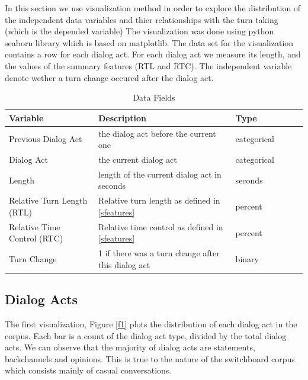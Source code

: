 In this section we use visualization method in order to explore the distribution of the independent data variables and thier relationships with the turn taking (which is the depended variable) 
%
The visualization was done using python seaborn library which is based on matplotlib. The data set for the visualization contains a row for each dialog act. For each dialog act we measure its length, and the values of the summary features (RTL and RTC). The independent variable denote wether a turn change occured after the dialog act.

\begin{table}[ht!]
\begin{center}
\begin{tabular}{llllrr}
\toprule
Variable &  Description & Type &\\
\midrule
     Previous Dialog Act & the dialog act before the current one  & categorical\\
     Dialog Act & the current dialog act & categorical \\
     Length & length of the current dialog act in seconds & seconds \\
     Relative Turn Length (RTL)  & Relative turn length as defined in \ref{sfeatures} & percent \\
     Relative Time Control (RTC) & Relative time control as defined in \ref{sfeatures} & percent \\
     Turn Change & 1 if there was a turn change after this dialog act & binary \\
\bottomrule
\end{tabular}
\end{center}
\caption{Data Fields}
\end{table}


\subsection{Dialog Acts}

The first visualization, Figure \ref{f1} plots the distribution of each dialog act in the corpus. Each bar is a count of the dialog act type, divided by the total dialog acts.  We can observe that the majority of dialog acts are statements, backchannels and opinions. This is true to the nature of the switchboard corpus which consists mainly of casual conversations.

